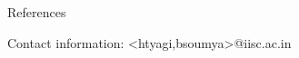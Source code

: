 \documentclass[final,hyperref={pdfpagelabels=false}]{beamer}
\begin{document}
\begin{frame}[t]
\begin{columns}[t]
\begin{column}{.465\textwidth}
\begin{block}{References}
        
\nocite{*} %
\small{


}
\end{block}
\begin{block}{Contact information: \textless htyagi,bsoumya\textgreater @iisc.ac.in}

\end{block}

\end{column} %

\begin{column}{.015\textwidth}\end{column} %

\end{columns} %

\end{frame} %
\end{document}
